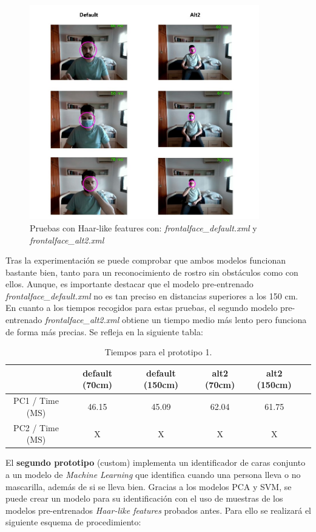 \begin{figure}[htp]
	\centering
	\includegraphics[width=10cm]{imagenes/prueba_proto1.jpg}
	\caption{Pruebas con Haar-like features con: \textit{frontalface\_default.xml} y \textit{frontalface\_alt2.xml}}
	\label{fig:haar1}
\end{figure}

Tras la experimentación se puede comprobar que ambos modelos funcionan bastante bien, tanto para un reconocimiento de rostro sin obstáculos como con ellos. Aunque, es importante destacar que el modelo pre-entrenado \textit{frontalface\_default.xml} no es tan preciso en distancias superiores a los 150 cm. En cuanto a los tiempos recogidos para estas pruebas, el segundo modelo pre-entrenado \textit{frontalface\_alt2.xml} obtiene un tiempo medio más lento pero funciona de forma más precias. Se refleja en la siguiente tabla:

\begin{table}[h!]
	\begin{center}
		\begin{tabular}{ |c|c|c|c|c|c| } 
			\hline
			& default (70cm) & default (150cm) & alt2 (70cm) & alt2 (150cm) \\
			\hline
			PC1 / Time (MS) & 46.15  & 45.09 & 62.04  & 61.75 \\
			\hline
			PC2 / Time (MS) & X  & X & X  & X \\
			\hline
		\end{tabular}
		\caption{Tiempos para el prototipo 1.}
		\label{tab:table2}
	\end{center}
\end{table}

El \textbf{segundo prototipo} (custom) implementa un identificador de caras conjunto a un modelo de \textit{Machine Learning} que identifica cuando una persona lleva o no mascarilla, además de si se lleva bien. Gracias a los modelos PCA y SVM, se puede crear un modelo para su identificación con el uso de muestras de los modelos pre-entrenados \textit{Haar-like features} probados antes. Para ello se realizará el siguiente esquema de procedimiento:

